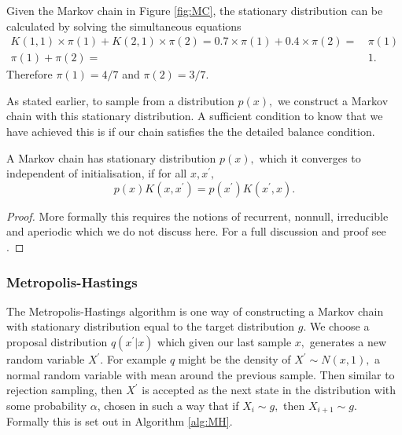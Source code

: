 \begin{example}
    Given the Markov chain in Figure \ref{fig:MC}, the stationary distribution
    can be calculated by solving the simultaneous equations
    \begin{align*}
        K(1, 1) \times \pi(1)
        + K(2, 1) \times \pi(2) = 0.7 \times \pi(1)
        + 0.4 \times \pi(2) = & \, \pi(1) \\
        \pi(1) + \pi(2) =     & \, 1.
    \end{align*}
    Therefore $\pi(1) = 4/7$ and $\pi(2) = 3/7.$
\end{example}

As stated earlier, to sample from a distribution $p(x),$ we construct a Markov
chain with this stationary distribution. A sufficient condition to know that
we have achieved this is if our chain satisfies the the detailed balance
condition.

\begin{theorem}
    A Markov chain has stationary distribution $p(x),$ which it converges to
    independent of initialisation, if for all $x, x^\prime,$
    $$p(x)K(x, x^\prime) = p(x^\prime)K(x^\prime, x).$$
\end{theorem}

\begin{proof}
    More formally this requires the notions of recurrent, nonnull,
    irreducible and aperiodic which we do not discuss here. For a full
    discussion and proof
    see \cite[chapter 6]{robert_monte_2010}.
\end{proof}

\subsubsection*{Metropolis-Hastings}

The Metropolis-Hastings algorithm is one way of constructing a Markov
chain with stationary distribution equal to the target distribution $g.$
We choose a proposal distribution $q(x^\prime| x)$ which given our last sample
$x,$ generates a new random
variable $X^\prime.$ For example $q$ might be the density of
$X^\prime \sim N(x, 1),$ a normal random variable with mean
around the previous sample. Then similar to rejection sampling, then $X^\prime$
is accepted as the next state in the distribution with some probability
$\alpha$, chosen in such a way that if
$X_i \sim g,$ then $X_{i + 1}\sim g.$ Formally this is set out in
Algorithm \ref{alg:MH}.

